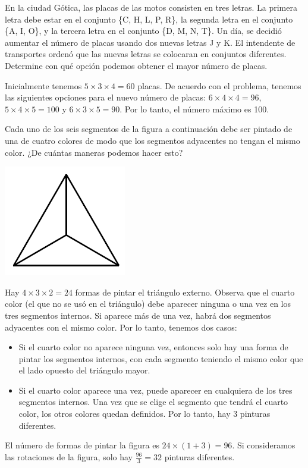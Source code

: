 \documentclass[11pt]{scrartcl}
\begin{document}
\begin{problem}
En la ciudad Gótica, las placas de las motos consisten en tres letras. La primera letra debe estar en el conjunto \{C, H, L, P, R\}, la segunda letra en el conjunto \{A, I, O\}, y la tercera letra en el conjunto \{D, M, N, T\}. Un día, se decidió aumentar el número de placas usando dos nuevas letras J y K. El intendente de transportes ordenó que las nuevas letras se colocaran en conjuntos diferentes. Determine con qué opción podemos obtener el mayor número de placas.
\begin{hint}
Inicialmente tenemos $5 \times 3 \times 4 = 60$ placas. De acuerdo con el problema, tenemos las siguientes opciones para el nuevo número de placas: $6 \times 4 \times 4 = 96$, $5 \times 4 \times 5 = 100$ y $6 \times 3 \times 5 = 90$. Por lo tanto, el número máximo es 100.
\end{hint}
\end{problem}

\begin{problem}[Mayo de 1998] Cada uno de los seis segmentos de la figura a continuación debe ser pintado de una de cuatro colores de modo que los segmentos adyacentes no tengan el mismo color. ¿De cuántas maneras podemos hacer esto?
\begin{center}
    \includegraphics[scale=1]{images/clase_05_mayo.png}
\end{center}
\begin{hint}
Hay $4 \times 3 \times 2 = 24$ formas de pintar el triángulo externo. Observa que el cuarto color (el que no se usó en el triángulo) debe aparecer ninguna o una vez en los tres segmentos internos. Si aparece más de una vez, habrá dos segmentos adyacentes con el mismo color. Por lo tanto, tenemos dos casos:
\begin{itemize}
\item Si el cuarto color no aparece ninguna vez, entonces solo hay una forma de pintar los segmentos internos, con cada segmento teniendo el mismo color que el lado opuesto del triángulo mayor.
\item Si el cuarto color aparece una vez, puede aparecer en cualquiera de los tres segmentos internos. Una vez que se elige el segmento que tendrá el cuarto color, los otros colores quedan definidos. Por lo tanto, hay 3 pinturas diferentes.
\end{itemize}
El número de formas de pintar la figura es $24 \times (1 + 3) = 96$. Si consideramos las rotaciones de la figura, solo hay $\frac{96}{3} = 32$ pinturas diferentes.
\end{hint}
\end{problem}
\end{document}
